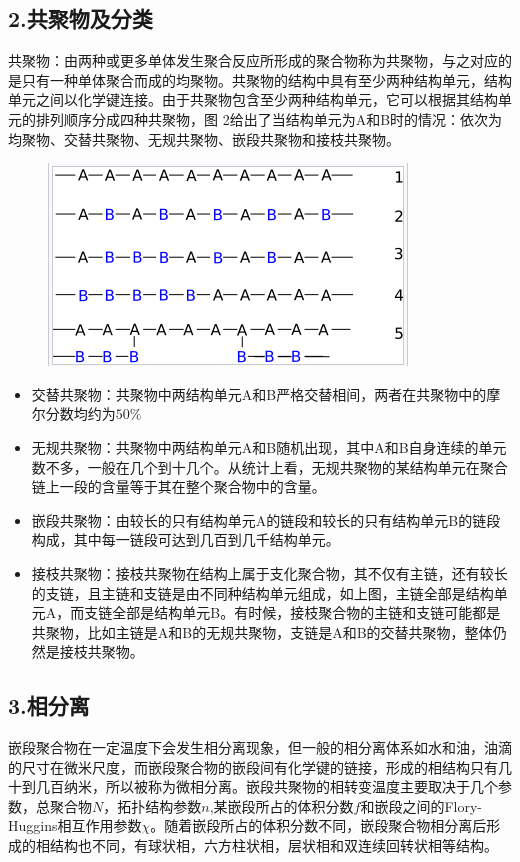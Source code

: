 \documentclass{article}
\begin{document}
\subsection{2.共聚物及分类}
共聚物：由两种或更多单体发生聚合反应所形成的聚合物称为共聚物，与之对应的是只有一种单体聚合而成的均聚物。共聚物的结构中具有至少两种结构单元，结构单元之间以化学键连接。由于共聚物包含至少两种结构单元，它可以根据其结构单元的排列顺序分成四种共聚物，图 2给出了当结构单元为A和B时的情况：依次为均聚物、交替共聚物、无规共聚物、嵌段共聚物和接枝共聚物。
\begin{figure}[H]
\centering
\includegraphics[scale=0.5]{./figures/Figure_25.png}
\caption{}
\end{figure}
\begin{itemize}
\item 交替共聚物：共聚物中两结构单元A和B严格交替相间，两者在共聚物中的摩尔分数均约为$50\%$
\item 无规共聚物：共聚物中两结构单元A和B随机出现，其中A和B自身连续的单元数不多，一般在几个到十几个。从统计上看，无规共聚物的某结构单元在聚合链上一段的含量等于其在整个聚合物中的含量。
\item 嵌段共聚物：由较长的只有结构单元A的链段和较长的只有结构单元B的链段构成，其中每一链段可达到几百到几千结构单元。
\item 接枝共聚物：接枝共聚物在结构上属于支化聚合物，其不仅有主链，还有较长的支链，且主链和支链是由不同种结构单元组成，如上图，主链全部是结构单元A，而支链全部是结构单元B。有时候，接枝聚合物的主链和支链可能都是共聚物，比如主链是A和B的无规共聚物，支链是A和B的交替共聚物，整体仍然是接枝共聚物。
\end{itemize}
\subsection{3.相分离}
嵌段聚合物在一定温度下会发生相分离现象，但一般的相分离体系如水和油，油滴的尺寸在微米尺度，而嵌段聚合物的嵌段间有化学键的链接，形成的相结构只有几十到几百纳米，所以被称为微相分离。嵌段共聚物的相转变温度主要取决于几个参数，总聚合物$N$，拓扑结构参数$n$,某嵌段所占的体积分数$f$和嵌段之间的Flory-Huggins相互作用参数$\chi$。随着嵌段所占的体积分数不同，嵌段聚合物相分离后形成的相结构也不同，有球状相，六方柱状相，层状相和双连续回转状相等结构。
\end{document}
